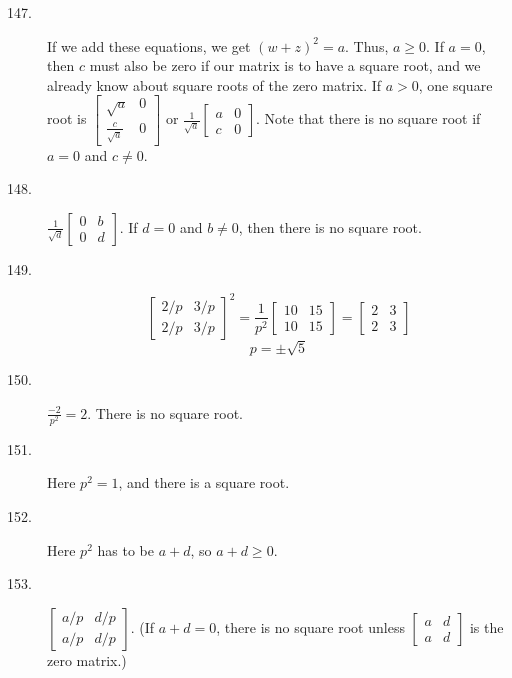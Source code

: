 \documentclass{article}
\begin{document}
\begin{description}

  \item[147.] If we add these equations, we get $(w+z)^2 = a$. Thus, $a \geq 0$. If $a = 0$, then $c$ must also be zero if our matrix is to have a square root, and we already know about square roots of the zero matrix. If $a>0$, one square root is $\begin{bmatrix} \sqrt{a} & 0 \\ \frac{c}{\sqrt{a}} & 0 \end{bmatrix}$ or $\frac{1}{\sqrt{a}}  \begin{bmatrix} a & 0 \\ c & 0 \end{bmatrix}$. Note that there is no square root if $a = 0$ and $c \neq 0$.

  \item[148.] $\frac{1}{\sqrt{d}} \begin{bmatrix} 0 & b \\ 0 & d \end{bmatrix}$. If $d = 0$ and $b \neq 0$, then there is no square root.

  \item[149.]
    \begin{equation*}
    \begin{bmatrix} 2/p & 3/p \\ 2/p & 3/p \end{bmatrix} ^2
    = \frac{1}{p^2}
    \begin{bmatrix} 10 & 15 \\ 10 & 15 \end{bmatrix}
    =
    \begin{bmatrix} 2 & 3 \\ 2 & 3 \end{bmatrix}
    \end{equation*}
    \begin{equation*}
    p = \pm \sqrt{5}
    \end{equation*}

  \item[150.] $\frac{-2}{p^2} = 2$. There is no square root.

  \item[151.] Here $p^2 = 1$, and there is a square root.

  \item[152.] Here $p^2$ has to be $a+d$, so $a+d \geq 0$.

  \item[153.] $\begin{bmatrix} a/p & d/p \\ a/p & d/p \end{bmatrix}$. (If $a+d=0$, there is no square root unless $\begin{bmatrix} a & d \\ a & d \end{bmatrix}$ is the zero matrix.)


\end{description}
\end{document}
